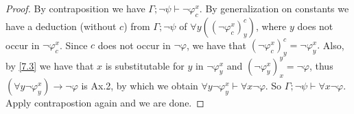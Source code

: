 \begin{proof}
  By contraposition we have $\Gamma;\neg \psi\vdash\neg \varphi_c^x$. By generalization on constants we have a deduction (without $c$) from $\Gamma;\neg \psi$ of $\forall y((\neg \varphi_c^x)_y^c)$, where $y$ does not occur in $\neg\varphi_c^x$. Since $c$ does not occur in $\neg\varphi$, we have that $(\neg\varphi_c^x)_y^c=\neg\varphi_y^x.$ Also, by \ref{7.3} we have that $x$ is substitutable for $y$ in $\neg \varphi_y^x$ and $(\neg \varphi_y^x)_x^y=\neg \varphi$, thus $(\forall y \neg\varphi_y^x)\to \neg\varphi$ is Ax.2, by which we obtain $\forall y\neg \varphi_y^x\vdash\forall x\neg \varphi$. So $\Gamma;\neg \psi\vdash\forall x\neg \varphi.$ Apply contrapostion again and we are done.
\end{proof}

